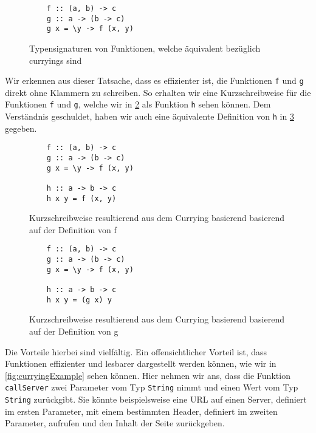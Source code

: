 \documentclass{hhuarticle}
\theoremstyle{definition}
\theoremstyle{theorem}
\begin{document}
  \begin{figure}[h]
    \begin{verbatim}
    f :: (a, b) -> c
    g :: a -> (b -> c)
    g x = \y -> f (x, y)
    \end{verbatim}
    \caption{Typensignaturen von Funktionen, welche äquivalent bezüglich curryings sind}%
    \label{fig:currying1}
  \end{figure}

  Wir erkennen aus dieser Tatsache, dass es effizienter ist, die Funktionen
  \verb|f| und \verb|g| direkt ohne Klammern zu schreiben. So erhalten wir
  eine Kurzschreibweise für die Funktionen \verb|f| und \verb|g|, welche
  wir in \cref{fig:curryingf} als Funktion \verb|h| sehen können.
  Dem Verständnis geschuldet, haben wir auch eine äquivalente Definition
  von \verb|h| in \cref{fig:curryingg} gegeben.

  \begin{figure}[h]
    \begin{verbatim}
    f :: (a, b) -> c
    g :: a -> (b -> c)
    g x = \y -> f (x, y)

    h :: a -> b -> c
    h x y = f (x, y)
    \end{verbatim}
    \caption{Kurzschreibweise resultierend aus dem Currying basierend basierend auf der Definition von f}%
    \label{fig:curryingf}
  \end{figure}

  \begin{figure}[h]
    \begin{verbatim}
    f :: (a, b) -> c
    g :: a -> (b -> c)
    g x = \y -> f (x, y)

    h :: a -> b -> c
    h x y = (g x) y
    \end{verbatim}
    \caption{Kurzschreibweise resultierend aus dem Currying basierend basierend auf der Definition von g}%
    \label{fig:curryingg}
  \end{figure}

  Die Vorteile hierbei sind vielfältig. Ein offensichtlicher Vorteil ist,
  dass Funktionen effizienter und lesbarer dargestellt werden können,
  wie wir in \cref{fig:curryingExample} sehen können. Hier nehmen wir
  ans, dass die Funktion \verb|callServer| zwei Parameter vom Typ \verb|String| nimmt
  und einen Wert vom Typ \verb|String| zurückgibt. Sie könnte beispielsweise
  eine URL auf einen Server, definiert im ersten Parameter, mit
  einem bestimmten Header, definiert im zweiten Parameter, aufrufen und
  den Inhalt der Seite zurückgeben.
\end{document}
